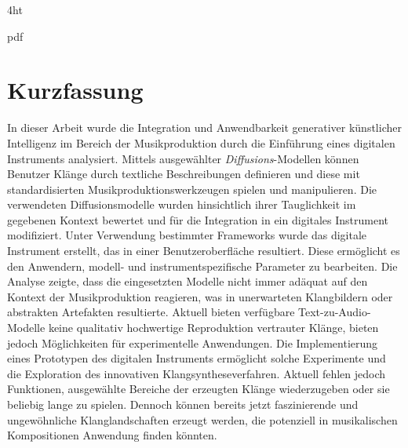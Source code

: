 \documentclass[
  a4paper,  %
  twoside,  %
  bibliography=totoc,
  headsepline,
  cleardoublepage=empty,
  parskip=half,
  draft=false
]{scrbook}
\begin{document}
\iftex4ht
  \Configure{$}{\PicMath}{\EndPicMath}{}

  {pdf}
  {%
  }
\fi



\Coverpage
\Copyright
\pagestyle{preamble}
\renewcommand*{\chapterpagestyle}{preamble}



\section*{Kurzfassung}

In dieser Arbeit wurde die Integration und Anwendbarkeit generativer künstlicher Intelligenz im Bereich der Musikproduktion durch die Einführung eines digitalen Instruments analysiert. Mittels ausgewählter \emph{Diffusions}-Modellen können Benutzer Klänge durch textliche Beschreibungen definieren und diese mit standardisierten Musikproduktionswerkzeugen spielen und manipulieren. Die verwendeten Diffusionsmodelle wurden hinsichtlich ihrer Tauglichkeit im gegebenen Kontext bewertet und für die Integration in ein digitales Instrument modifiziert. Unter Verwendung bestimmter Frameworks wurde das digitale Instrument erstellt, das in einer Benutzeroberfläche resultiert. Diese ermöglicht es den Anwendern, modell- und instrumentspezifische Parameter zu bearbeiten. Die Analyse zeigte, dass die eingesetzten Modelle nicht immer adäquat auf den Kontext der Musikproduktion reagieren, was in unerwarteten Klangbildern oder abstrakten Artefakten resultierte. Aktuell bieten verfügbare Text-zu-Audio-Modelle keine qualitativ hochwertige Reproduktion vertrauter Klänge, bieten jedoch Möglichkeiten für experimentelle Anwendungen. Die Implementierung eines Prototypen des digitalen Instruments ermöglicht solche Experimente und die Exploration des innovativen Klangsyntheseverfahren. Aktuell fehlen jedoch Funktionen, ausgewählte Bereiche der erzeugten Klänge wiederzugeben oder sie beliebig lange zu spielen. Dennoch können bereits jetzt faszinierende und ungewöhnliche Klanglandschaften erzeugt werden, die potenziell in musikalischen Kompositionen Anwendung finden könnten. 
\end{document}
